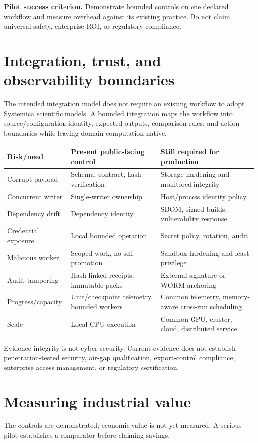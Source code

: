 \documentclass[9pt,a4paper]{article}
\begin{document}
\textbf{Pilot success criterion.} Demonstrate bounded controls on one declared workflow and measure overhead against its existing practice. Do not claim universal safety, enterprise ROI, or regulatory compliance.

\section{Integration, trust, and observability boundaries}
The intended integration model does not require an existing workflow to adopt Systemica scientific models. A bounded integration maps the workflow into source/configuration identity, expected outputs, comparison rules, and action boundaries while leaving domain computation native.

\begin{tabularx}{\textwidth}{p{}YY}
\toprule Risk/need & Present public-facing control & Still required for production\\\midrule
Corrupt payload & Schema, contract, hash verification & Storage hardening and monitored integrity\\
Concurrent writer & Single-writer ownership & Host/process identity policy\\
Dependency drift & Dependency identity & SBOM, signed builds, vulnerability response\\
Credential exposure & Local bounded operation & Secret policy, rotation, audit\\
Malicious worker & Scoped work, no self-promotion & Sandbox hardening and least privilege\\
Audit tampering & Hash-linked receipts, immutable packs & External signature or WORM anchoring\\
Progress/capacity & Unit/checkpoint telemetry, bounded workers & Common telemetry, memory-aware cross-run scheduling\\
Scale & Local CPU execution & Common GPU, cluster, cloud, distributed service\\
\bottomrule
\end{tabularx}

Evidence integrity is not cyber-security. Current evidence does not establish penetration-tested security, air-gap qualification, export-control compliance, enterprise access management, or regulatory certification.

\section{Measuring industrial value}
The controls are demonstrated; economic value is not yet measured. A serious pilot establishes a comparator before claiming savings.
\end{document}
